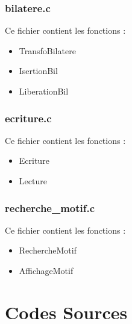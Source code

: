 \documentclass{report}
\newenvironment{myindentpar}[1]%
    {\begin{list}{}%
             {\setlength{\leftmargin}{#1}}%
             \item[]%
     }
     {\end{list}}
\begin{document}
\subsubsection{bilatere.c}
Ce fichier contient les fonctions :
\begin{myindentpar}{2cm}
\begin{itemize}
    \item TransfoBilatere
    \item IsertionBil
    \item LiberationBil
\end{itemize}
\end{myindentpar}

\subsubsection{ecriture.c}
Ce fichier contient les fonctions :
\begin{myindentpar}{2cm}
\begin{itemize}
    \item Ecriture
    \item Lecture
\end{itemize}
\end{myindentpar}

\subsubsection{recherche\_motif.c}
Ce fichier contient les fonctions :
\begin{myindentpar}{2cm}
\begin{itemize}
    \item RechercheMotif
    \item AffichageMotif
\end{itemize}
\end{myindentpar}

\newpage
\section{Codes Sources}\label{codes}
\end{document}

